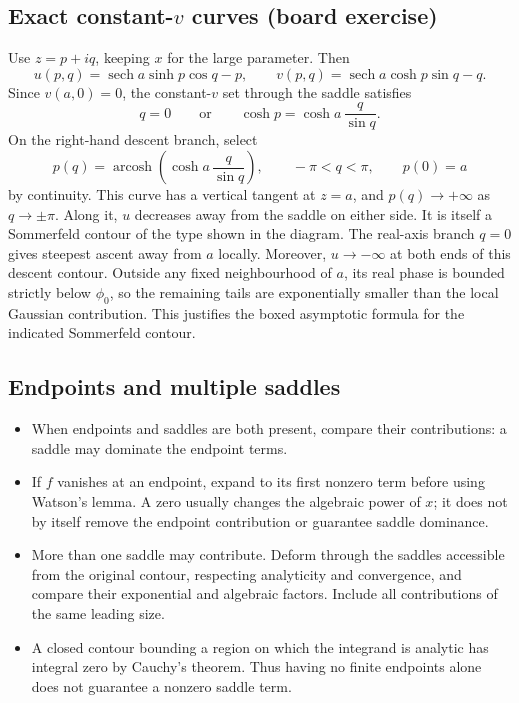 \documentclass[11pt,a4paper]{article}
\begin{document}
\subsection*{Exact constant-$v$ curves (board exercise)}
Use $z=p+iq$, keeping $x$ for the large parameter. Then
\[
    u(p,q)=\operatorname{sech}a\sinh p\cos q-p,
    \qquad
    v(p,q)=\operatorname{sech}a\cosh p\sin q-q.
\]
Since $v(a,0)=0$, the constant-$v$ set through the saddle satisfies
\[
    q=0\qquad\text{or}\qquad
    \cosh p=\cosh a\,\frac{q}{\sin q}.
\]
On the right-hand descent branch, select
\[
    p(q)=\operatorname{arcosh}\!\left(\cosh a\,\frac{q}{\sin q}\right),
    \qquad -\pi<q<\pi,
    \qquad p(0)=a
\]
by continuity. This curve has a vertical tangent at $z=a$, and
$p(q)\to+\infty$ as $q\to\pm\pi$. Along it, $u$ decreases away from
the saddle on either side. It is itself a Sommerfeld contour of the
type shown in the diagram. The real-axis branch $q=0$ gives steepest
ascent away from $a$ locally.
Moreover, $u\to-\infty$ at both ends of this descent contour. Outside
any fixed neighbourhood of $a$, its real phase is bounded strictly
below $\phi_0$, so the remaining tails are exponentially smaller than
the local Gaussian contribution. This justifies the boxed asymptotic
formula for the indicated Sommerfeld contour.

\clearpage
\subsection*{Endpoints and multiple saddles}
\begin{itemize}
    \item When endpoints and saddles are both present, compare their
    contributions: a saddle may dominate the endpoint terms.
    \item If $f$ vanishes at an endpoint, expand to its first nonzero
    term before using Watson's lemma. A zero usually changes the
    algebraic power of $x$; it does not by itself remove the endpoint
    contribution or guarantee saddle dominance.
    \item More than one saddle may contribute. Deform through the
    saddles accessible from the original contour, respecting analyticity
    and convergence, and compare their exponential and algebraic factors.
    Include all contributions of the same leading size.
    \item A closed contour bounding a region on which the integrand
    is analytic has integral zero by Cauchy's theorem. Thus having no
    finite endpoints alone does not guarantee a nonzero saddle term.
\end{itemize}
\end{document}

